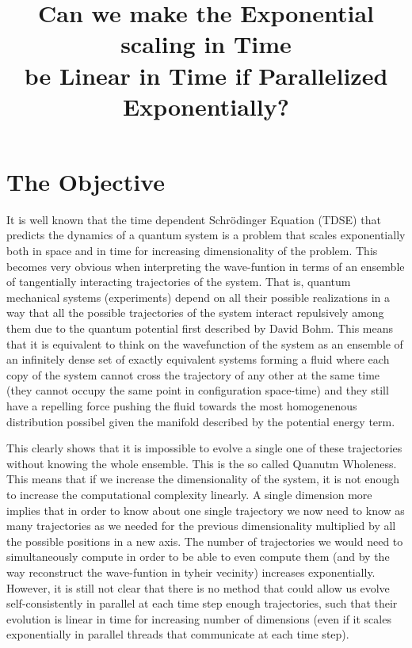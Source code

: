 \documentclass[11pt, a4paper]{article} %
\title{\vspace{-2.5cm} {\bf Can we make the Exponential scaling in Time\\ be Linear in Time if Parallelized Exponentially?} \vspace{-0.4cm}  }
\date{\vspace{-11ex}}
\begin{document}
\maketitle

\tableofcontents
{}
\clearpage
{}
\setcounter{page}{1}
\vspace{-0.3 cm}
\section{The Objective}
It is well known that the time dependent Schrödinger Equation (TDSE) that predicts the dynamics of a quantum system is a problem that scales exponentially both in space and in time for increasing dimensionality of the problem. This becomes very obvious when interpreting the wave-funtion in terms of an ensemble of tangentially interacting trajectories of the system. That is, quantum mechanical systems (experiments) depend on all their possible realizations in a way that all the possible trajectories of the system interact repulsively among them due to the quantum potential first described by David Bohm. This means that it is equivalent to think on the wavefunction of the system as an ensemble of an infinitely dense set of exactly equivalent systems forming a fluid where each copy of the system cannot cross the trajectory of any other at the same time (they cannot occupy the same point in configuration space-time) and they still have a repelling force pushing the fluid towards the most homogenenous distribution possibel given the manifold described by the potential energy term. 

This clearly shows that it is impossible to evolve a single one of these trajectories without knowing the whole ensemble. This is the so called Quanutm Wholeness. This means that if we increase the dimensionality of the system, it is not enough to increase the computational complexity linearly. A single dimension more implies that in order to know about one single trajectory we now need to know as many trajectories as we needed for the previous dimensionality multiplied by all the possible positions in a new axis. The number of trajectories we would need to simultaneously compute in order to be able to even compute them (and by the way reconstruct the wave-funtion in tyheir vecinity) increases exponentially. However, it is still not clear that there is no method that could allow us evolve self-consistently in parallel at each time step enough trajectories, such that their evolution is linear in time for increasing number of dimensions (even if it scales exponentially in parallel threads that communicate at each time step).
\end{document}
